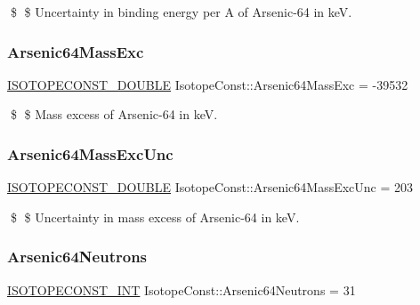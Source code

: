 \$ \$ Uncertainty in binding energy per A of Arsenic-\/64 in keV. \mbox{\label{group___isotope_const-_arsenic-_as64_gac53f0dc24f6c47dadbd0d4ddaed8b5f1}} 
\subsubsection{\texorpdfstring{Arsenic64\+Mass\+Exc}{Arsenic64MassExc}}
{\footnotesize\ttfamily \mbox{\hyperlink{group___isotope_const-_macros_ga8f45a7272ce02c0b4c65c44636ed719a}{I\+S\+O\+T\+O\+P\+E\+C\+O\+N\+S\+T\+\_\+\+D\+O\+U\+B\+LE}} Isotope\+Const\+::\+Arsenic64\+Mass\+Exc = -\/39532}

\$ \$ Mass excess of Arsenic-\/64 in keV. \mbox{\label{group___isotope_const-_arsenic-_as64_gaae1c728e4d1993dc6841d46e61ccb50a}} 
\subsubsection{\texorpdfstring{Arsenic64\+Mass\+Exc\+Unc}{Arsenic64MassExcUnc}}
{\footnotesize\ttfamily \mbox{\hyperlink{group___isotope_const-_macros_ga8f45a7272ce02c0b4c65c44636ed719a}{I\+S\+O\+T\+O\+P\+E\+C\+O\+N\+S\+T\+\_\+\+D\+O\+U\+B\+LE}} Isotope\+Const\+::\+Arsenic64\+Mass\+Exc\+Unc = 203}

\$ \$ Uncertainty in mass excess of Arsenic-\/64 in keV. \mbox{\label{group___isotope_const-_arsenic-_as64_gad523912c04133d54f722734dbf34860b}} 
\subsubsection{\texorpdfstring{Arsenic64\+Neutrons}{Arsenic64Neutrons}}
{\footnotesize\ttfamily \mbox{\hyperlink{group___isotope_const-_macros_ga5f18360b3e99483a35c32d789e62621c}{I\+S\+O\+T\+O\+P\+E\+C\+O\+N\+S\+T\+\_\+\+I\+NT}} Isotope\+Const\+::\+Arsenic64\+Neutrons = 31}

